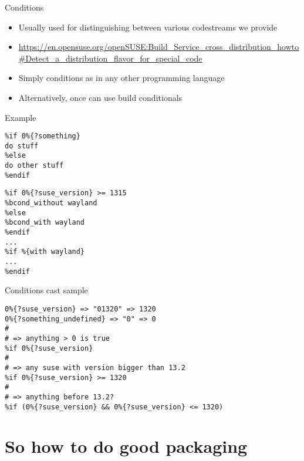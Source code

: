 \documentclass{beamer}
\begin{document}
\begin{frame}[t]{Conditions}
	\begin{itemize}
	\item Usually used for distinguishing between various codestreams we provide
	\item \begin{tiny}\url{https://en.opensuse.org/openSUSE:Build\_Service\_cross\_distribution\_howto\#Detect\_a\_distribution\_flavor\_for\_special_code}\end{tiny}
	\item Simply conditions as in any other programming language
	\item Alternatively, once can use build conditionals
	\end{itemize}
\end{frame}

\begin{frame}[fragile]{Example}
	\begin{small}
	\begin{verbatim}
%if 0%{?something}
do stuff
%else
do other stuff
%endif
	\end{verbatim}
	\end{small}
	\begin{small}
	\begin{verbatim}
%if 0%{?suse_version} >= 1315
%bcond_without wayland
%else
%bcond_with wayland
%endif
...
%if %{with wayland}
...
%endif
	\end{verbatim}
	\end{small}
\end{frame}

\begin{frame}[fragile]{Conditions cast sample}
       \begin{small}
       \begin{verbatim}
0%{?suse_version} => "01320" => 1320
0%{?something_undefined} => "0" => 0
#
# => anything > 0 is true
%if 0%{?suse_version}
#
# => any suse with version bigger than 13.2
%if 0%{?suse_version} >= 1320
#
# => anything before 13.2?
%if (0%{?suse_version} && 0%{?suse_version} <= 1320)
       \end{verbatim}
       \end{small}
\end{frame}

\section{So how to do good packaging}
\end{document}
